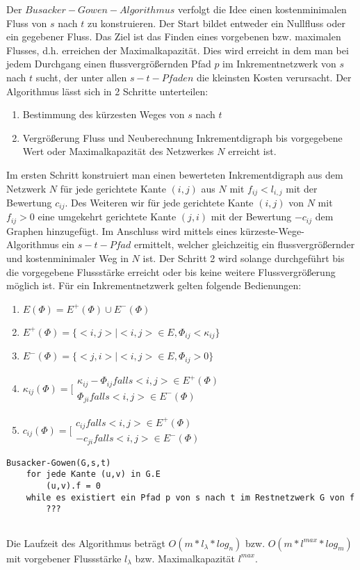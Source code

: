 Der $Busacker-Gowen-Algorithmus$ verfolgt die Idee einen kostenminimalen 
Fluss von $s$ nach $t$ zu konstruieren. Der Start bildet entweder ein 
Nullfluss oder ein gegebener Fluss. Das Ziel ist das Finden eines vorgebenen 
bzw. maximalen Flusses, d.h. erreichen der Maximalkapazität. Dies wird 
erreicht in dem man bei jedem Durchgang einen flussvergrößernden Pfad $p$ im 
Inkrementnetzwerk von $s$ nach $t$ sucht, der unter allen $s-t-Pfaden$ die 
kleinsten Kosten verursacht. Der Algorithmus lässt sich in 2 Schritte 
unterteilen:
\begin{enumerate}
 \item Bestimmung des kürzesten Weges von $s$ nach $t$
 \item Vergrößerung Fluss und Neuberechnung Inkrementdigraph bis vorgegebene 
 Wert oder Maximalkapazität des Netzwerkes $N$ erreicht ist. 
\end{enumerate}
Im ersten Schritt konstruiert man einen bewerteten Inkrementdigraph aus dem 
Netzwerk $N$ für jede gerichtete Kante $(i,j)$ aus $N$ mit $f_{ij} < l_{i,j}$
mit der Bewertung $c_{ij}$. Des Weiteren wir für jede gerichtete Kante 
$(i,j)$ von $N$ mit $f_{ij} > 0$ eine umgekehrt gerichtete Kante $(j,i)$ mit 
der Bewertung $-c_{ij}$ dem Graphen hinzugefügt. Im Anschluss wird mittels 
eines kürzeste-Wege-Algorithmus ein $s-t-Pfad$ ermittelt, welcher 
gleichzeitig ein flussvergrößernder und kostenminimaler Weg in $N$ ist. Der 
Schritt 2 wird solange durchgeführt bis die vorgegebene Flussstärke erreicht
oder bis keine weitere Flussvergrößerung möglich ist. Für ein 
Inkrementnetzwerk gelten
folgende Bedienungen:
\begin{enumerate}
 \item $E(\Phi)=E^+(\Phi)\cup E^-(\Phi)$
 \item $E^+(\Phi)=\{<i,j>|<i,j> \in E,\Phi_{ij} < \kappa_{ij}\}$
 \item $E^-(\Phi)=\{<j,i>|<i,j> \in E,\Phi_{ij} > 0\}$
 \item $\kappa_{ij}(\Phi)=\biggl[\begin{array}{ll}\kappa_{ij}-\Phi_{ij} falls
 <i,j> \in E^+(\Phi) \\ \Phi_{ji} falls <i,j> \in E^-(\Phi) \end{array}$
 \item $c_{ij}(\Phi)=\biggl[\begin{array}{ll}c_{ij}falls<i,j> \in E^+(\Phi)
  \\ -c_{ji}falls<i,j> \in E^-(\Phi)\end{array}$
\end{enumerate}

\begin{lstlisting}
Busacker-Gowen(G,s,t)
    for jede Kante (u,v) in G.E 
        (u,v).f = 0
    while es existiert ein Pfad p von s nach t im Restnetzwerk G von f
        ???
    
\end{lstlisting}

Die Laufzeit des Algorithmus beträgt $O(m * l_\lambda * log_n)$ bzw. 
$O(m * l^{max} * log_m)$ mit vorgebener Flussstärke $l_\lambda$ bzw. 
Maximalkapazität $l^{max}$. \cite{kripfganz, optiv, tudortmund}